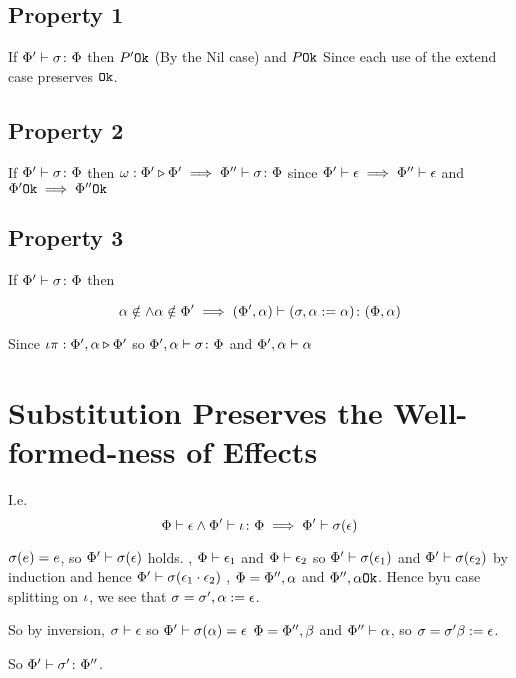 \documentclass{report}
\begin{document}
\subsection{Property 1}
If $\Phi' \vdash \sigma \colon \Phi$ then $P' \texttt{Ok}$ (By  the 
Nil case) and $P \texttt{Ok}$ Since each use of the extend case preserves $\texttt{Ok}$.

\subsection{Property 2}
If $\Phi' \vdash \sigma \colon \Phi$ then $\omega : \Phi' \triangleright \Phi' \implies \Phi'' \vdash \sigma \colon \Phi$ since $\Phi'\vdash \epsilon\implies \Phi''\vdash \epsilon$ and $\Phi' \texttt{Ok}\implies \Phi'' \texttt{Ok}$


\subsection{Property 3}
If $\Phi' \vdash \sigma \colon \Phi$ then

\begin{equation}
    \alpha\notin\wedge\alpha\notin\Phi' \implies (\Phi', \alpha) \vdash (\sigma, \alpha:=\alpha) \colon (\Phi,\alpha)
\end{equation}

Since $\iota\pi : \Phi',\alpha \triangleright \Phi'$ so $\Phi',\alpha \vdash \sigma \colon \Phi$ and $\Phi',\alpha\vdash \alpha$

\section{Substitution Preserves the Well-formed-ness of Effects}

I.e. \begin{equation}
    \Phi\vdash \epsilon\wedge\Phi' \vdash \iota \colon \Phi \implies \Phi'\vdash \sigma(\epsilon)
\end{equation}

\proof
{}
$\sigma(e) = e$, so $\Phi'\vdash \sigma(\epsilon)$ holds.
\bi, $\Phi\vdash \epsilon_1$ and $\Phi\vdash \epsilon_2$ so $\Phi'\vdash \sigma(\epsilon_1)$ and $\Phi'\vdash \sigma(\epsilon_2)$ by induction and hence $\Phi'\vdash \sigma(\epsilon_1\cdot\epsilon_2)$
\bi, $\Phi=\Phi'',\alpha$ and $\Phi'',\alpha \texttt{Ok}$. Hence byu case splitting on $\iota$, we see that $\sigma=\sigma', \alpha:=\epsilon$.

So by inversion, $\sigma\vdash \epsilon$ so $\Phi'\vdash \sigma(\alpha)=\epsilon$
\bi $\Phi=\Phi'', \beta$ and $\Phi''\vdash \alpha$, so $\sigma=\sigma'\beta:=\epsilon$.

So $\Phi' \vdash \sigma' \colon \Phi''$.
\end{document}
